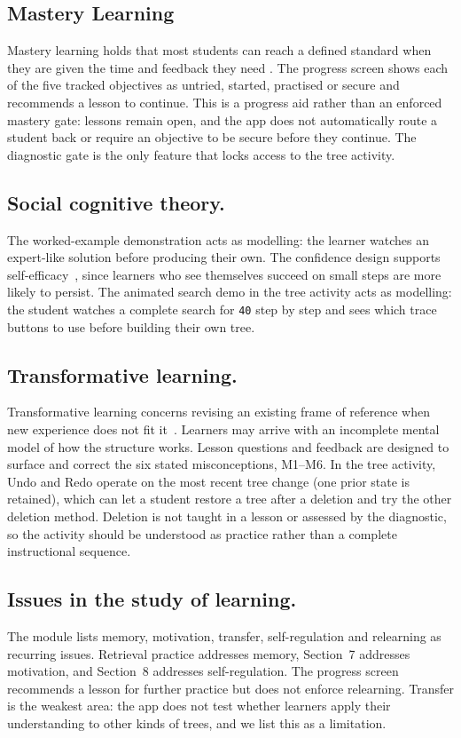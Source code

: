 \subsection{Mastery Learning}
Mastery learning holds that most students can reach a defined standard when they are given the time and feedback they need \cite{Bloom1968}. The progress screen shows each of the five tracked objectives as untried, started, practised or secure and recommends a lesson to continue. This is a progress aid rather than an enforced mastery gate: lessons remain open, and the app does not automatically route a student back or require an objective to be secure before they continue. The diagnostic gate is the only feature that locks access to the tree activity.

\subsection{Social cognitive theory.} The worked-example demonstration acts as modelling: the learner watches an expert-like solution before producing their own. The confidence design supports self-efficacy~\cite{Bandura1977}, since learners who see themselves succeed on small steps are more likely to persist. The animated search demo in the tree activity acts as modelling: the student watches a complete search for \texttt{40} step by step and sees which trace buttons to use before building their own tree.
 
\subsection{Transformative learning.} Transformative learning concerns revising an existing frame of reference when new experience does not fit it~\cite{Mezirow1991}. Learners may arrive with an incomplete mental model of how the structure works. Lesson questions and feedback are designed to surface and correct the six stated misconceptions, M1--M6. In the tree activity, Undo and Redo operate on the most recent tree change (one prior state is retained), which can let a student restore a tree after a deletion and try the other deletion method. Deletion is not taught in a lesson or assessed by the diagnostic, so the activity should be understood as practice rather than a complete instructional sequence.

\subsection{Issues in the study of learning.} The module lists memory, motivation, transfer, self-regulation and relearning as recurring issues. Retrieval practice addresses memory, Section~7 addresses motivation, and Section~8 addresses self-regulation. The progress screen recommends a lesson for further practice but does not enforce relearning. Transfer is the weakest area: the app does not test whether learners apply their understanding to other kinds of trees, and we list this as a limitation.